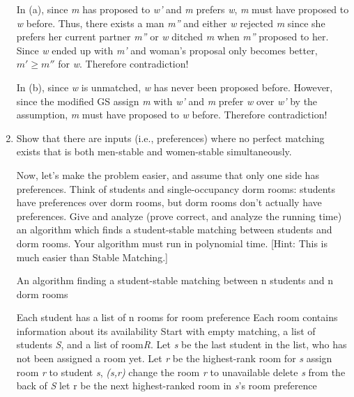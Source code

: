 \documentclass{homework}
\begin{document}
\begin{enumerate}
    In (a), since \textit{m} has proposed to \textit{w'} and \textit{m} prefers \textit{w}, \textit{m} must have proposed to \textit{w} before. Thus, there exists a man \textit{m''} and either \textit{w} rejected \textit{m} since she prefers her current partner \textit{m''} or \textit{w} ditched \textit{m} when \textit{m''} proposed to her. Since \textit{w} ended up with \textit{m'} and woman's proposal only becomes better, \textit{$m' \geq m''$} for \textit{w}. Therefore contradiction!
    
    In (b), since \textit{w} is unmatched, \textit{w} has never been proposed before. However, since the modified GS assign \textit{m} with \textit{w'} and \textit{m} prefer \textit{w} over \textit{w'} by the assumption, \textit{m} must have proposed to \textit{w} before. Therefore contradiction!

    \item 
    \question[1] Show that there are inputs (i.e., preferences) where no perfect matching exists that is both men-stable and women-stable simultaneously.

    \question[2] Now, let’s make the problem easier, and assume that only one side has preferences. Think of students and single-occupancy dorm rooms: students have preferences over dorm rooms, but dorm rooms don’t actually have preferences. Give and analyze (prove correct, and analyze the running time) an algorithm which finds a student-stable matching between students and dorm rooms. Your algorithm must run in polynomial time.
    [Hint: This is much easier than Stable Matching.]

 
    \begin{algorithm}
    \caption{An algorithm finding a student-stable matching between n students and n dorm rooms}\label{alg:cap}
    \begin{algorithmic}
    \Require Each student has a list of n rooms for room preference
    \Ensure Each room contains information about its availability
    \State Start with empty matching, a list of students \textit{S}, and a list of room\textit{R}.
        \State Let \textit{s} be the last student in the list, who has not been assigned a room yet.
        \State Let \textit{r} be the highest-rank room for \textit{s}
                    \State assign room \textit{r} to student \textit{s}, \textit{(s,r)}
                    \State change the room \textit{r} to unavailable \State delete \textit{s} from the back of \textit{S}
                \Else
                    \State let r be the next highest-ranked room in \textit{s}'s room preference
                \EndIf
        \EndWhile
    \EndWhile
    \end{algorithmic}
    \end{algorithm}


\end{enumerate}
\end{document}
